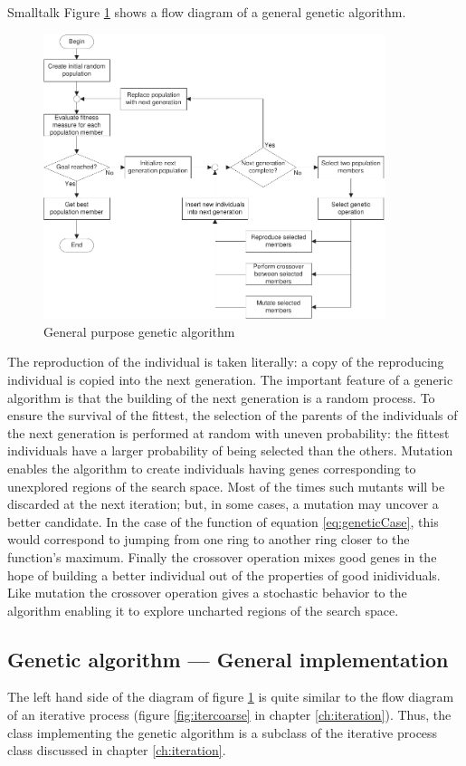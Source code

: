 \begin{displaycode}{Smalltalk}
Figure \ref{fig:geneticFlow} shows a flow diagram of a general
genetic algorithm.
\begin{figure}
\centering\includegraphics[width=10cm]{Figures/GeneticFlow}
\caption{General purpose genetic algorithm}\label{fig:geneticFlow}
\end{figure}
The reproduction of the individual is taken literally: a copy of
the reproducing individual is copied into the next generation. The
important feature of a generic algorithm is that the building of
the next generation is a random process. To ensure the survival of
the fittest, the selection of the parents of the individuals of
the next generation is performed at random with uneven
probability: the fittest individuals have a larger probability of
being selected than the others. Mutation enables the algorithm to
create individuals having genes corresponding to unexplored
regions of the search space. Most of the times such mutants will
be discarded at the next iteration; but, in some cases, a mutation
may uncover a better candidate. In the case of the function of
equation \ref{eq:geneticCase}, this would correspond to jumping
from one ring to another ring closer to the function's maximum.
Finally the crossover operation mixes good genes in the hope of
building a better individual out of the properties of good
inidividuals. Like mutation the crossover operation gives a
stochastic behavior to the algorithm enabling it to explore
uncharted regions of the search space.


\subsection{Genetic algorithm --- General implementation}
\label{sec:gengenetic} The left hand side of the diagram of figure
\ref{fig:geneticFlow} is quite similar to the flow diagram of an
iterative process (\cf figure \ref{fig:itercoarse} in chapter
\ref{ch:iteration}). Thus, the class implementing the genetic
algorithm is a subclass of the iterative process class discussed
in chapter \ref{ch:iteration}.


\end{displaycode}
